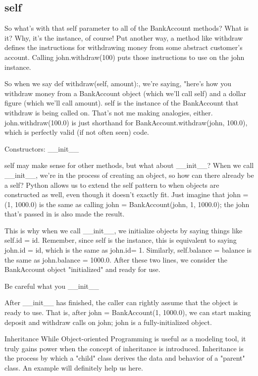 \subsection{self}

So what's with that self parameter to all of the BankAccount methods? What is it? Why, it's the instance, of course! Put another way, a method like withdraw defines the instructions for withdrawing money from some abstract customer's account. Calling john.withdraw(100) puts those instructions to use on the john instance.

So when we say def withdraw(self, amount):, we're saying, "here's how you withdraw money from a BankAccount object (which we'll call self) and a dollar figure (which we'll call amount). self is the instance of the BankAccount that  withdraw is being called on. That's not me making analogies, either. john.withdraw(100.0) is just shorthand for BankAccount.withdraw(john, 100.0), which is perfectly valid (if not often seen) code.

Constructors: __init__

self may make sense for other methods, but what about __init__? When we call __init__, we're in the process of creating an object, so how can there already be a self? Python allows us to extend the self pattern to when objects are constructed as well, even though it doesn't exactly fit. Just imagine that john = (1, 1000.0) is the same as calling john = BankAccount(john, 1, 1000.0); the john that's passed in is also made the result.

This is why when we call __init__, we initialize objects by saying things like self.id = id. Remember, since self is the instance, this is equivalent to saying john.id = id, which is the same as john.id= 1. Similarly, self.balance = balance is the same as john.balance = 1000.0. After these two lines, we consider the BankAccount object "initialized" and ready for use.

Be careful what you __init__

After __init__ has finished, the caller can rightly assume that the object is ready to use. That is, after john = BankAccount(1, 1000.0), we can start making deposit and withdraw calls on john; john is a fully-initialized object.

Inheritance
While Object-oriented Programming is useful as a modeling tool, it truly gains power when the concept of inheritance is introduced. Inheritance is the process by which a "child" class derives the data and behavior of a "parent" class. An example will definitely help us here.

